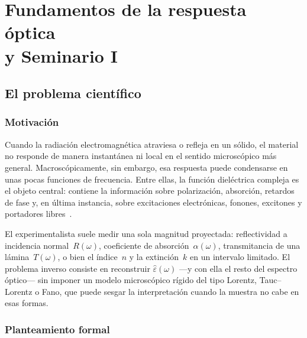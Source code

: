 \part{\texorpdfstring{Fundamentos de la respuesta \'optica\\y Seminario I}{Fundamentos de la respuesta optica: Seminario I}}

\chapter{El problema cient\'ifico}
\label{ch:problema}

\section{Motivaci\'on}

Cuando la radiaci\'on electromagn\'etica atraviesa o refleja en un s\'olido, el material no responde de manera instant\'anea ni local en el sentido microsc\'opico m\'as general.
Macrosc\'opicamente, sin embargo, esa respuesta puede condensarse en unas pocas funciones de frecuencia.
Entre ellas, la funci\'on diel\'ectrica compleja es el objeto central:
contiene la informaci\'on sobre polarizaci\'on, absorci\'on, retardos de fase y, en \'ultima instancia, sobre excitaciones electr\'onicas, fonones, excitones y portadores libres~\cite{electrodynamics,MarkFox}.

El experimentalista suele medir una sola magnitud proyectada:
reflectividad a incidencia normal~$R(\omega)$,
coeficiente de absorci\'on~$\alpha(\omega)$,
transmitancia de una l\'amina~$T(\omega)$,
o bien el \'indice~$n$ y la extinci\'on~$k$ en un intervalo limitado.
El problema inverso consiste en reconstruir $\hat\varepsilon(\omega)$ ---y con ella el resto del espectro \'optico--- sin imponer un modelo microsc\'opico r\'igido del tipo Lorentz, Tauc--Lorentz o Fano, que puede sesgar la interpretaci\'on cuando la muestra no cabe en esas formas.

\section{Planteamiento formal}

